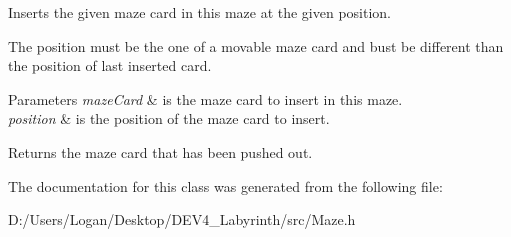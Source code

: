 Inserts the given maze card in this maze at the given position. 

The position must be the one of a movable maze card and bust be different than the position of last inserted card.


\begin{DoxyParams}{Parameters}
{\em maze\+Card} & is the maze card to insert in this maze. \\
\hline
{\em position} & is the position of the maze card to insert. \\
\hline
\end{DoxyParams}
\begin{DoxyReturn}{Returns}
the maze card that has been pushed out. 
\end{DoxyReturn}


The documentation for this class was generated from the following file\+:\begin{DoxyCompactItemize}
\item 
D\+:/\+Users/\+Logan/\+Desktop/\+D\+E\+V4\+\_\+\+Labyrinth/src/Maze.\+h\end{DoxyCompactItemize}
